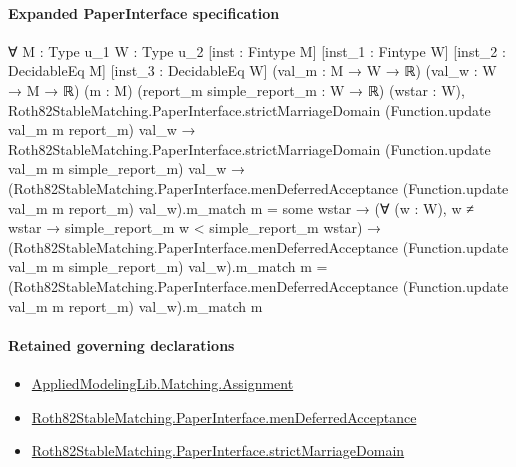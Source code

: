 \documentclass[10pt]{article}
\begin{document}
\paragraph{Expanded PaperInterface specification}
\begin{ReviewVerbatim}
∀ {M : Type u_1} {W : Type u_2} [inst : Fintype M] [inst_1 : Fintype W] [inst_2 : DecidableEq M]
  [inst_3 : DecidableEq W] (val_m : M → W → ℝ) (val_w : W → M → ℝ) (m : M) (report_m simple_report_m : W → ℝ)
  (wstar : W),
  Roth82StableMatching.PaperInterface.strictMarriageDomain (Function.update val_m m report_m) val_w →
    Roth82StableMatching.PaperInterface.strictMarriageDomain (Function.update val_m m simple_report_m) val_w →
      (Roth82StableMatching.PaperInterface.menDeferredAcceptance (Function.update val_m m report_m) val_w).m_match m =
          some wstar →
        (∀ (w : W), w ≠ wstar → simple_report_m w < simple_report_m wstar) →
          (Roth82StableMatching.PaperInterface.menDeferredAcceptance (Function.update val_m m simple_report_m)
                  val_w).m_match
              m =
            (Roth82StableMatching.PaperInterface.menDeferredAcceptance (Function.update val_m m report_m) val_w).m_match
              m
\end{ReviewVerbatim}

\paragraph{Retained governing declarations}
\begin{itemize}\raggedright
\item \hyperlink{governing-declaration-508c084086b006b8}{Applied\allowbreak{}Modeling\allowbreak{}Lib.\allowbreak{}Matching.\allowbreak{}Assignment}
\item \hyperlink{governing-declaration-7357e0557237bc7e}{Roth82\allowbreak{}Stable\allowbreak{}Matching.\allowbreak{}Paper\allowbreak{}Interface.\allowbreak{}men\allowbreak{}Deferred\allowbreak{}Acceptance}
\item \hyperlink{governing-declaration-d06ec2a2987f0c72}{Roth82\allowbreak{}Stable\allowbreak{}Matching.\allowbreak{}Paper\allowbreak{}Interface.\allowbreak{}strict\allowbreak{}Marriage\allowbreak{}Domain}
\end{itemize}
\end{document}
